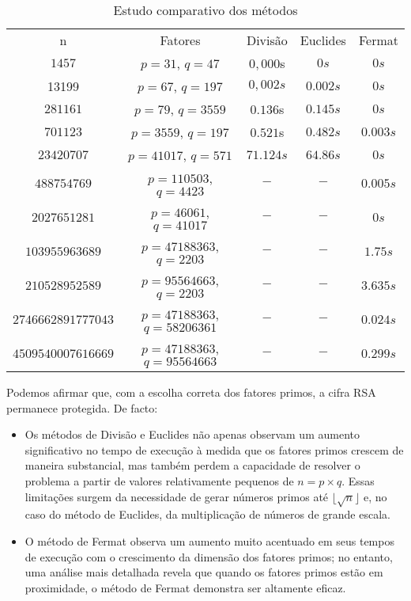 \begin{table}[h]
\centering
\caption{Estudo comparativo dos métodos}
\label{tab:EstudoMetodo}
\begin{tabular}{>{\columncolor{gray!20}}ccccc}
n & \cellcolor{gray!20}Fatores & \cellcolor{gray!20}Divisão & \cellcolor{gray!20}Euclides & \cellcolor{gray!20}Fermat\\
$1457$ & $p=31$, $q=47$ & $0,000$s & $0s$&$0s$\\
13199 &$p=67$, $q=197$&$0,002s$ & $0.002s$& $0s$\\
$281161$ & $p=79$, $q=3559$  & $0.136$s& $0.145s$&$0s$\\
$701123$ & $p=3559$, $q=197$ &$0.521$s& $0.482s$&$0.003s$\\
$23420707$&$p=41017$, $q=571$ & $71.124s$ & $64.86s$&$0s$\\
$488754769$ & $p=110503$, $q=4423$  & $-$ & $-$&$0.005s$\\
$2027651281$ & $p=46061$, $q=41017$ & $-$ & $-$&$0s$\\
$103955963689$ & $p=47188363$, $q=2203$  & $-$& $-$&$1.75s$\\
$210528952589$ & $p=95564663$, $q=2203$  & $-$ & $-$&$3.635s$\\
$2746662891777043$ & $p=47188363$, $q=58206361$  & $-$ & $-$&$0.024s$\\
$4509540007616669$ & $p=47188363$, $q=95564663$  & $-$ & $-$&$0.299s$\\
\end{tabular}
\end{table}


Podemos afirmar que, com a escolha correta dos fatores primos, a cifra RSA permanece protegida. De facto:
\begin{itemize}
    \item[] Os métodos de Divisão e Euclides não apenas observam um aumento significativo no tempo de execução à medida que os fatores primos crescem de maneira substancial, mas também perdem a capacidade de resolver o problema a partir de valores relativamente pequenos de $n=p\times q$. Essas limitações surgem da necessidade de gerar números primos até $\lfloor \sqrt{n} \rfloor$ e, no caso do método de Euclides, da multiplicação de números de grande escala.
    \item[]O método de Fermat observa um aumento muito acentuado em seus tempos de execução com o crescimento da dimensão dos fatores primos; no entanto, uma análise mais detalhada revela que quando os fatores primos estão em proximidade, o método de Fermat demonstra ser altamente eficaz.
\end{itemize}

